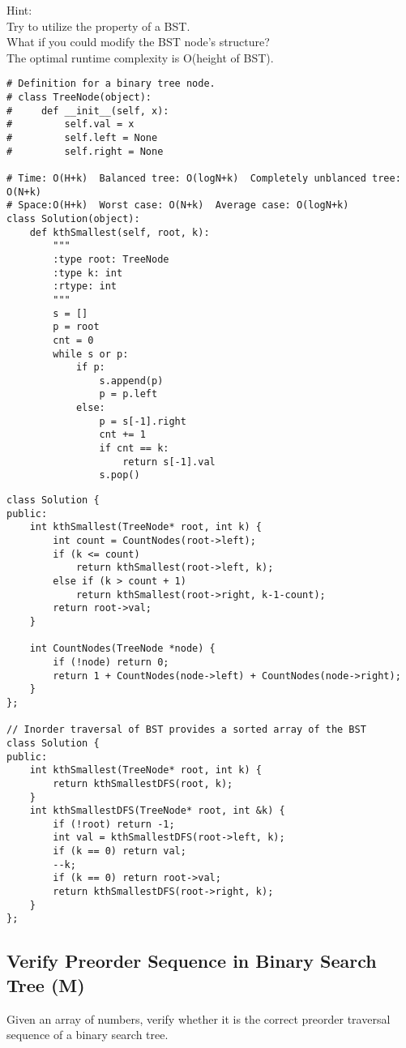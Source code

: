 Hint:\\
    Try to utilize the property of a BST.\\
    What if you could modify the BST node's structure?\\
    The optimal runtime complexity is O(height of BST).\\

\begin{lstlisting}
# Definition for a binary tree node.
# class TreeNode(object):
#     def __init__(self, x):
#         self.val = x
#         self.left = None
#         self.right = None

# Time: O(H+k)  Balanced tree: O(logN+k)  Completely unblanced tree: O(N+k)
# Space:O(H+k)  Worst case: O(N+k)  Average case: O(logN+k)
class Solution(object):
    def kthSmallest(self, root, k):
        """
        :type root: TreeNode
        :type k: int
        :rtype: int
        """
        s = []
        p = root
        cnt = 0
        while s or p:
            if p:
                s.append(p)
                p = p.left
            else:
                p = s[-1].right
                cnt += 1
                if cnt == k:
                    return s[-1].val
                s.pop()
\end{lstlisting}

\begin{lstlisting}
class Solution {
public:
    int kthSmallest(TreeNode* root, int k) {
        int count = CountNodes(root->left);
        if (k <= count)
            return kthSmallest(root->left, k);
        else if (k > count + 1)
            return kthSmallest(root->right, k-1-count);
        return root->val;
    }
    
    int CountNodes(TreeNode *node) {
        if (!node) return 0;
        return 1 + CountNodes(node->left) + CountNodes(node->right);
    }
};

// Inorder traversal of BST provides a sorted array of the BST
class Solution {
public:
    int kthSmallest(TreeNode* root, int k) {
        return kthSmallestDFS(root, k);
    }
    int kthSmallestDFS(TreeNode* root, int &k) {
        if (!root) return -1;
        int val = kthSmallestDFS(root->left, k);
        if (k == 0) return val;
        --k;
        if (k == 0) return root->val;
        return kthSmallestDFS(root->right, k);
    }
};
\end{lstlisting}


\subsection{Verify Preorder Sequence in Binary Search Tree (M)}
Given an array of numbers, verify whether it is the correct preorder traversal sequence of a binary search tree.\\

